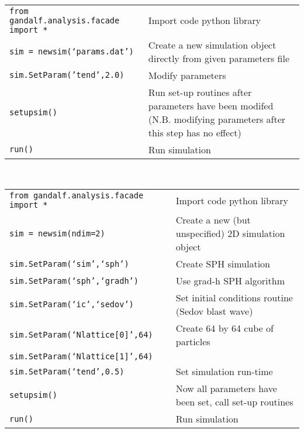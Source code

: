 \documentclass[a4paper]{article}
\newcommand{\var}[1]{\texttt{#1}}
\begin{document}
 \\
\newline
\begin{tabular}{p{8.0cm}p{7.0cm}}
\var{from gandalf.analysis.facade import *}& Import code python library \\
\var{sim = newsim(`params.dat')}           & Create a new simulation object directly from given parameters file \\
\var{sim.SetParam('tend',2.0)}              & Modify parameters \\
\var{setupsim()}                           & Run set-up routines after parameters have been modifed (N.B. modifying parameters after this step has no effect) \\
\var{run()}                                & Run simulation
\end{tabular}
\vspace{1cm}

 \\
\newline
\begin{tabular}{p{8.0cm}p{7.0cm}}
\var{from gandalf.analysis.facade import *}& Import code python library \\
\var{sim = newsim(ndim=2)}                 & Create a new (but unspecified) 2D simulation object \\
\var{sim.SetParam(`sim',`sph')}            & Create SPH simulation \\
\var{sim.SetParam(`sph',`gradh')}          & Use grad-h SPH algorithm \\
\var{sim.SetParam(`ic',`sedov')}           & Set initial conditions routine (Sedov blast wave) \\
\var{sim.SetParam(`Nlattice[0]',64)}       & Create 64 by 64 cube of particles \\
\var{sim.SetParam(`Nlattice[1]',64)}       & \\
\var{sim.SetParam(`tend',0.5)}             & Set simulation run-time \\
\var{setupsim()}                           & Now all parameters have been set, call set-up routines \\
\var{run()}                                & Run simulation
\end{tabular}
\vspace{1cm}
\end{document}
